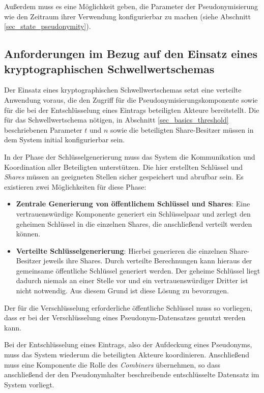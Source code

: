 Außerdem muss es eine Möglichkeit geben, die Parameter der Pseudonymisierung wie den Zeitraum ihrer Verwendung konfigurierbar zu machen (siehe Abschnitt \ref{sec_state_pseudonymity}).

\subsection{Anforderungen im Bezug auf den Einsatz eines kryptographischen Schwellwertschemas}

\label{subsec_impl_requirements_threshold}


Der Einsatz eines kryptographischen Schwellwertschemas setzt eine verteilte Anwendung voraus, die den Zugriff für die Pseudonymisierungskomponente sowie für die bei der Entschlüsselung eines Eintrags beteiligten Akteure bereitstellt. Die für das Schwellwertschema nötigen, in Abschnitt \ref{sec_basics_threshold} beschriebenen Parameter \(t\) und \(n\)  sowie die beteiligten Share-Besitzer müssen in dem System initial konfigurierbar sein.

In der Phase der Schlüsselgenerierung muss das System die Kommunikation und Koordination aller Beteiligten unterstützen. Die hier erstellten Schlüssel und \textit{Shares} müssen an geeigneten Stellen sicher gespeichert und abrufbar sein. Es existieren zwei Möglichkeiten für diese Phase:
\begin{itemize}
  \item \textbf{Zentrale Generierung von öffentlichem Schlüssel und Shares}: Eine vertrauenswürdige Komponente generiert ein Schlüsselpaar und zerlegt den geheimen Schlüssel in die einzelnen Shares, die anschließend verteilt werden können. 
  \item \textbf{Verteilte Schlüsselgenerierung}: Hierbei generieren die einzelnen Share-Besitzer jeweils ihre Shares. Durch verteilte Berechnungen kann hieraus der gemeinsame öffentliche Schlüssel generiert werden. Der geheime Schlüssel liegt dadurch niemals an einer Stelle vor und ein vertrauenswürdiger Dritter ist nicht notwendig. Aus diesem Grund ist diese Lösung zu bevorzugen.
\end{itemize}

Der für die Verschlüsselung erforderliche öffentliche Schlüssel muss so vorliegen, dass er bei der Verschlüsselung eines Pseudonym-Datensatzes genutzt werden kann.

Bei der Entschlüsselung eines Eintrags, also der Aufdeckung eines Pseudonyms, muss das System wiederum die beteiligten Akteure koordinieren. Anschließend muss eine Komponente die Rolle des \textit{Combiners} übernehmen, so dass anschließend der den Pseudonymhalter beschreibende entschlüsselte Datensatz im System  vorliegt.

